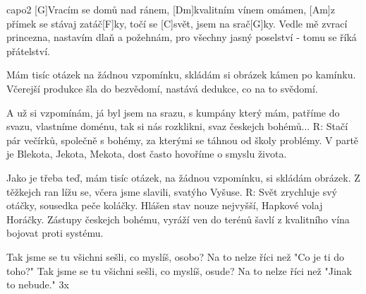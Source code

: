 \hfill capo2
[G]Vracím se domů nad ránem, [Dm]kvalitním vínem omámen,
[Am]z přímek se stávaj zatáč[F]ky, točí se [C]svět, jsem na srač[G]ky.
Vedle mě zvrací princezna, nastavím dlaň a požehnám,
pro všechny jasný poselství - tomu se říká přátelství.

Mám tisíc otázek na žádnou vzpomínku,
skládám si obrázek kámen po kamínku.
Včerejší produkce šla do bezvědomí,
nastává dedukce, co na to svědomí.

A už si vzpomínám, já byl jsem na srazu,
s kumpány který mám, patříme do svazu,
vlastníme doménu, tak si nás rozklikni,
svaz českejch bohémů...
R:
Stačí pár večírků, společně s bohémy,
za kterými se táhnou od školy problémy.
V partě je Blekota, Jekota, Mekota,
dost často hovoříme o smyslu života.

Jako je třeba teď, mám tisíc otázek,
na žádnou vzpomínku, si skládám obrázek.
Z těžkejch ran lížu se, včera jsme slavili,
svatýho Vyšuse.
R:
Svět zrychluje svý otáčky, sousedka peče koláčky.
Hlášen stav nouze nejvyšší, Hapkové volaj Horáčky.
Zástupy českejch bohému, vyráží ven do terénů
šavlí z kvalitního vína bojovat proti systému.

Tak jsme se tu všichni sešli, co myslíš, osobo?
Na to nelze říci než "Co je ti do toho?"
Tak jsme se tu všichni sešli, co myslíš, osude?
Na to nelze říci než "Jinak to nebude." 3x